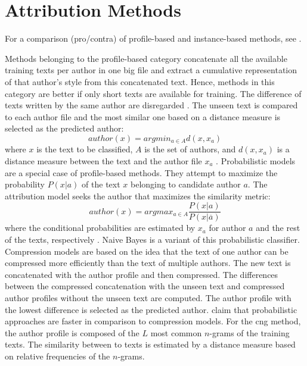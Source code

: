 \section{Attribution Methods}
\label{sec:attribution_methods}

For a comparison (pro/contra) of profile-based and instance-based methods, see \citet{stamatatos_survey_2009}.

Methods belonging to the profile-based category concatenate all the available training texts per author in one big file 
and extract a cumulative representation of that author's style from this concatenated text. %
Hence, methods in this category are better if only short texts are available for training.
The difference of texts written by the same author are disregarded \cite{stamatatos_survey_2009}.
The unseen text is compared to each author file and the most similar one based on a distance measure is selected as the predicted author:
$$ author(x) = argmin_{a \in A} d(x, x_a) $$
where $x$ is the text to be classified, $A$ is the set of authors, and $d(x, x_a)$ is a distance measure 
between the text and the author file $x_a$ \cite{stamatatos_survey_2009}.
Probabilistic models are a special case of profile-based methods.
They attempt to maximize the probability $P(x|a)$ of the text $x$ belonging to candidate author $a$.
The attribution model seeks the author that maximizes the similarity metric: 
$$ author(x) = argmax_{a \in A} \frac{P(x|a)}{P(x|\overline{a})} $$
where the conditional probabilities are estimated by $x_a$ for author $a$ and the rest of the texts, respectively \cite{stamatatos_survey_2009}.
Naive Bayes is a variant of this probabilistic  classifier.
Compression models are based on the idea that the text of one author can be compressed more efficiently than the text of multiple authors.
The new text is concatenated with the author profile and then compressed.
The differences between the compressed concatenation with the unseen text and compressed author profiles without the unseen text are computed.
The author profile with the lowest difference is selected as the predicted author.
\citet{stamatatos_survey_2009} claim that probabilistic approaches are faster in comparison to compression models.
For the \ac{cng} method, the author profile is composed of the $L$ most common $n$-grams of the training texts.
The similarity between to texts is estimated by a distance measure based on relative frequencies of the $n$-grams.
